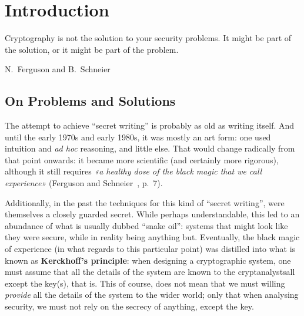 
\chapter{Introduction}
\label{cha:intro}

\epigraph{Cryptography is not the solution to your security problems. It might be part of the solution, or it might be part of the problem.}{N.\ Ferguson and B.\ Schneier}


\section{On Problems and Solutions}
  \label{sec:prob_sol}
  The attempt to achieve ``secret writing'' is probably as old as writing itself. And until the early 1970s and early 1980s, it was mostly an art form: one used intuition and \emph{ad hoc} reasoning, and little else. That would change radically from that point onwards: it became more scientific (and certainly more rigorous), although it still requires \emph{«a healthy dose of the black magic that we call experience»} (Ferguson and Schneier~\cite{Ferguson:Schneier:PracC}, p.\ 7).

  Additionally, in the past the techniques for this kind of ``secret writing'', were themselves a closely guarded secret. While perhaps understandable, this led to an abundance of what is usually dubbed ``snake oil'': systems that might look like they were secure, while in reality being anything but. Eventually, the black magic of experience (in what regards to this particular point) was distilled into what is known as \textbf{Kerckhoff's principle}: when designing a cryptographic system, one must assume that all the details of the system are known to the cryptanalysts\emd all except the key(s), that is. This of course, does not mean that we must willing \emph{provide} all the details of the system to the wider world; only that when analysing security, we must not rely on the secrecy of anything, except the key.

